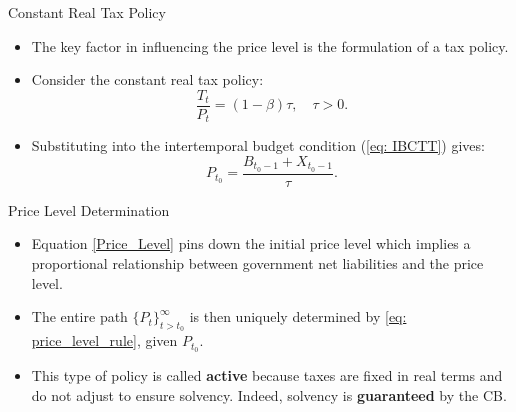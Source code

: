 \documentclass[11pt,aspectratio=169]{beamer}
\begin{document}
\begin{frame}{Constant Real Tax Policy}
\begin{itemize}
    \item The key factor in influencing the price level is the formulation of a tax policy.
    \vspace{0.25cm}
\item Consider the constant real tax policy:
    \begin{equation} \label{tax_policy}
    \frac{T_t}{P_t} = (1-\beta)\tau, \quad \tau>0.        
    \end{equation}
    \vspace{0.25cm}
    \item Substituting into the intertemporal budget condition (\ref{eq: IBCTT}) gives:
    \begin{equation} \label{Price_Level}
     P_{t_0} = \frac{B_{t_0-1} + X_{t_0-1}}{\tau}.
    \end{equation}
\end{itemize}
\end{frame}

\begin{frame}{Price Level Determination}
\begin{itemize}
    \item Equation \eqref{Price_Level} pins down the initial price level which implies a proportional relationship between government net liabilities and the price level.
    \vspace{0.25cm}
    
    \item The entire path $\{P_t\}_{t>t_0}^\infty$ is then uniquely determined by \eqref{eq: price_level_rule}, given $P_{t_0}$.
    \vspace{0.5cm}
\item This type of policy is called \textbf{active} because taxes are fixed in real terms and do not adjust to ensure solvency. Indeed, solvency is \textbf{guaranteed} by the CB.
\end{itemize}

\end{frame}
\end{document}
